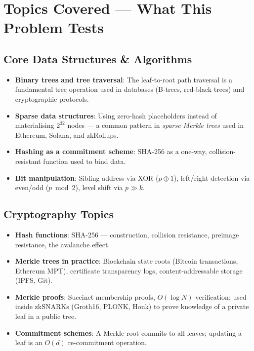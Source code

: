 \documentclass[12pt,a4paper]{article}
\begin{document}
\section{Topics Covered — What This Problem Tests}

\subsection{Core Data Structures \& Algorithms}

\begin{itemize}
  \item \textbf{Binary trees and tree traversal}: The leaf-to-root path
        traversal is a fundamental tree operation used in databases
        (B-trees, red-black trees) and cryptographic protocols.

  \item \textbf{Sparse data structures}: Using zero-hash placeholders instead
        of materialising $2^{32}$ nodes — a common pattern in
        \emph{sparse Merkle trees} used in Ethereum, Solana, and zkRollups.

  \item \textbf{Hashing as a commitment scheme}: SHA-256 as a one-way,
        collision-resistant function used to bind data.

  \item \textbf{Bit manipulation}: Sibling address via XOR ($p \oplus 1$),
        left/right detection via even/odd ($p \bmod 2$), level shift via
        $p \gg k$.
\end{itemize}

\subsection{Cryptography Topics}

\begin{itemize}
  \item \textbf{Hash functions}: SHA-256 — construction, collision resistance,
        preimage resistance, the avalanche effect.

  \item \textbf{Merkle trees in practice}: Blockchain state roots
        (Bitcoin transactions, Ethereum MPT), certificate transparency logs,
        content-addressable storage (IPFS, Git).

  \item \textbf{Merkle proofs}: Succinct membership proofs, $O(\log N)$
        verification; used inside zkSNARKs (Groth16, PLONK, Honk) to prove
        knowledge of a private leaf in a public tree.

  \item \textbf{Commitment schemes}: A Merkle root commits to all leaves;
        updating a leaf is an $O(d)$ re-commitment operation.
\end{itemize}
\end{document}
